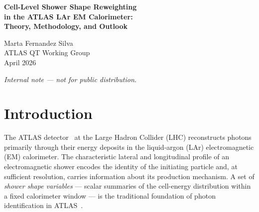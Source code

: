 \documentclass[11pt,a4paper]{article}
\begin{document}
\begin{titlepage}
  \centering
  \vspace*{2cm}
  {\LARGE\bfseries Cell-Level Shower Shape Reweighting\\[0.4em]
   in the ATLAS LAr EM Calorimeter:\\[0.4em]
   Theory, Methodology, and Outlook\par}
  \vspace{1.5cm}
  {\large Marta Fernandez Silva\\[0.3em]
   ATLAS QT Working Group\\[0.3em]
   April 2026\par}
  \vspace{2cm}
  \begin{abstract}
    \noindent
    Shower-shape variables computed from electromagnetic (EM) calorimeter cells
    are central to photon identification in the ATLAS experiment and to precision
    measurements such as the Higgs CP-structure combination.  Systematic
    discrepancies between data and Monte Carlo (MC) simulation in these variables
    propagate directly into photon-identification efficiencies and into the
    modelling of inputs to machine-learning classifiers that operate at the
    cell level.  This report provides a self-contained, pedagogical treatment
    of the origin of these discrepancies, the cell-level reweighting methodology
    developed to correct them, and a detailed analysis of why Layer~1 of the
    LAr accordion calorimeter presents substantially greater challenges than
    Layer~2.  Concrete proposals for binning optimisation, alternative
    correction strategies (normalising flows, classifier-based reweighting,
    optimal transport, and diffusion models), and actionable next steps are
    presented.
  \end{abstract}
  \vfill
  {\small\textit{Internal note — not for public distribution.}}
\end{titlepage}

\tableofcontents
\newpage

\section{Introduction}
\label{sec:intro}

The ATLAS detector~\cite{ATLAS:2008} at the Large Hadron Collider (LHC)
reconstructs photons primarily through their energy deposits in the
liquid-argon (LAr) electromagnetic (EM) calorimeter.  The
characteristic lateral and longitudinal profile of an electromagnetic
shower encodes the identity of the initiating particle and, at
sufficient resolution, carries information about its production
mechanism.  A set of \emph{shower shape variables} — scalar summaries
of the cell-energy distribution within a fixed calorimeter window — is
the traditional foundation of photon identification in
ATLAS~\cite{ATLAS:photonID2019,ATLAS:photonID2022}.
\end{document}
